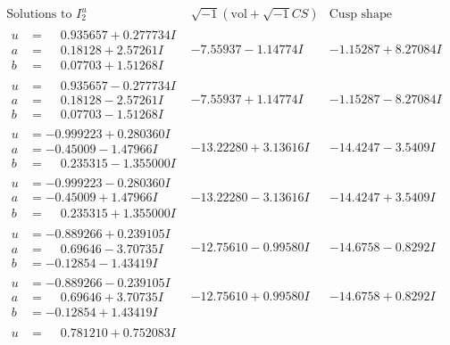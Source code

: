 \documentclass[1p]{elsarticle_modified}
\theoremstyle{definition}
\newcommand{\I}{\sqrt{-1}}
\begin{document}
$$\begin{array}{c|c|c}  
\text{Solutions to }I^u_{2}& \I (\text{vol} + \sqrt{-1}CS) & \text{Cusp shape}\\
 \hline 
\begin{aligned}
u &= \phantom{-}0.935657 + 0.277734 I \\
a &= \phantom{-}0.18128 + 2.57261 I \\
b &= \phantom{-}0.07703 + 1.51268 I\end{aligned}
 & -7.55937 - 1.14774 I & -1.15287 + 8.27084 I \\ \hline\begin{aligned}
u &= \phantom{-}0.935657 - 0.277734 I \\
a &= \phantom{-}0.18128 - 2.57261 I \\
b &= \phantom{-}0.07703 - 1.51268 I\end{aligned}
 & -7.55937 + 1.14774 I & -1.15287 - 8.27084 I \\ \hline\begin{aligned}
u &= -0.999223 + 0.280360 I \\
a &= -0.45009 - 1.47966 I \\
b &= \phantom{-}0.235315 - 1.355000 I\end{aligned}
 & -13.22280 + 3.13616 I & -14.4247 - 3.5409 I \\ \hline\begin{aligned}
u &= -0.999223 - 0.280360 I \\
a &= -0.45009 + 1.47966 I \\
b &= \phantom{-}0.235315 + 1.355000 I\end{aligned}
 & -13.22280 - 3.13616 I & -14.4247 + 3.5409 I \\ \hline\begin{aligned}
u &= -0.889266 + 0.239105 I \\
a &= \phantom{-}0.69646 - 3.70735 I \\
b &= -0.12854 - 1.43419 I\end{aligned}
 & -12.75610 - 0.99580 I & -14.6758 - 0.8292 I \\ \hline\begin{aligned}
u &= -0.889266 - 0.239105 I \\
a &= \phantom{-}0.69646 + 3.70735 I \\
b &= -0.12854 + 1.43419 I\end{aligned}
 & -12.75610 + 0.99580 I & -14.6758 + 0.8292 I \\ \hline\begin{aligned}
u &= \phantom{-}0.781210 + 0.752083 I \\

\end{aligned}
\end{array}$$
\end{document}
